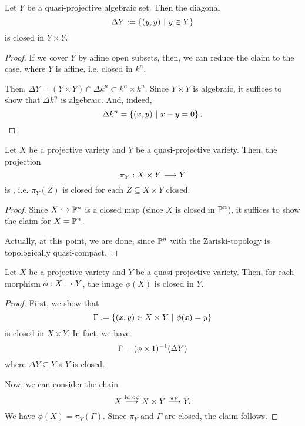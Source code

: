 \begin{lemma}
	Let $Y$ be a quasi-projective algebraic set. Then the diagonal
	\[ \Delta Y := \set{(y,y)}{y \in Y} \]
	is closed in $Y \times Y$.
\end{lemma}
\begin{proof}
	If we cover $Y$ by affine open subsets, then, we can reduce the claim to the case, where $Y$ is affine, i.e. closed in $k^n$.
	
	Then, $\Delta Y = (Y\times Y) \cap \Delta k^n \subset k^n \times k^n$. Since $Y \times Y$ is algebraic, it suffices to show that $\Delta k^n$ is algebraic. And, indeed,
	\[ \Delta k^n = \set{(x,y)}{x-y = 0}. \]
\end{proof}
\begin{theorem}[Thm2]
	Let $X$ be a projective variety and $Y$ be a quasi-projective variety. Then, the projection
	\[ \pi_Y : X\times Y \Pfeil{} Y \]
	is , i.e. $\pi_Y(Z)$ is closed for each $Z \subseteq X\times Y$ closed.
\end{theorem}
\begin{proof}
Since $X\inj{} \P^n$ is a closed map (since $X$ is closed in $\P^n$), it suffices to show the claim for $X = \P^n$.

Actually, at this point, we are done, since $\P^n$ with the Zariski-topology is topologically quasi-compact.
%
%
%
%
\end{proof}


\begin{theorem}[Thm1]
	Let $X$ be a projective variety and $Y$ be a quasi-projective variety. Then, for each morphism $\phi : X \pfeil{} Y$, the image $\phi(X)$ is closed in $Y$.
\end{theorem}
\begin{proof}
First, we show that
\[ \Gamma := \set{(x,y)\in X \times Y}{\phi(x) = y} \]
is closed in $X \times Y$. In fact, we have
\[ \Gamma = (\phi \times 1)\i(\Delta Y) \]
where $\Delta Y \subseteq Y \times Y$ is closed.

Now, we can consider the chain
\[ X \Pfeil{\id{} \times \phi } X \times Y \Pfeil{ \pi_Y } Y. \]
We have $\phi(X) = \pi_Y ( \Gamma )$. Since $\pi_Y$ and $\Gamma$ are closed, the claim follows.
\end{proof}


